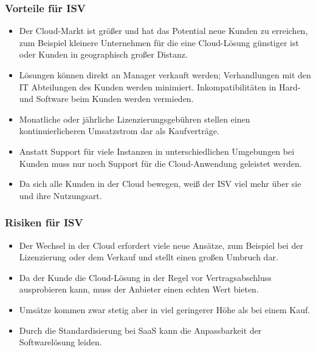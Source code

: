 \subsubsection{Vorteile für ISV}
\begin{itemize}
	\item Der Cloud-Markt ist größer und hat das Potential neue Kunden zu 
erreichen, zum Beispiel kleinere Unternehmen für die eine Cloud-Lösung 
günstiger ist oder Kunden in geographisch großer Distanz.
	\item Lösungen können direkt an Manager verkauft werden; Verhandlungen 
mit den IT Abteilungen des Kunden werden minimiert. Inkompatibilitäten in Hard- 
und Software beim Kunden werden vermieden.
	\item Monatliche oder jährliche Lizenzierungsgebühren stellen einen 
kontinuierlicheren Umsatzstrom dar als Kaufverträge.
	\item Anstatt Support für viele Instanzen in unterschiedlichen 
Umgebungen bei Kunden muss nur noch Support für die Cloud-Anwendung 
geleistet werden.
	\item Da sich alle Kunden in der Cloud bewegen, weiß der ISV viel mehr 
über sie und ihre Nutzungsart.
\end{itemize}

\subsubsection{Risiken für ISV}
\begin{itemize}
	\item Der Wechsel in der Cloud erfordert viele neue Ansätze, zum 
Beispiel bei der Lizenzierung oder dem Verkauf und stellt einen großen Umbruch 
dar.
	\item Da der Kunde die Cloud-Lösung in der Regel vor 
Vertragsabschluss ausprobieren kann, muss der Anbieter einen echten Wert 
bieten.
	\item Umsätze kommen zwar stetig aber in viel geringerer Höhe als bei 
einem Kauf.
	\item Durch die Standardisierung bei SaaS kann die Anpassbarkeit 
der Softwarelösung leiden.
\end{itemize}


